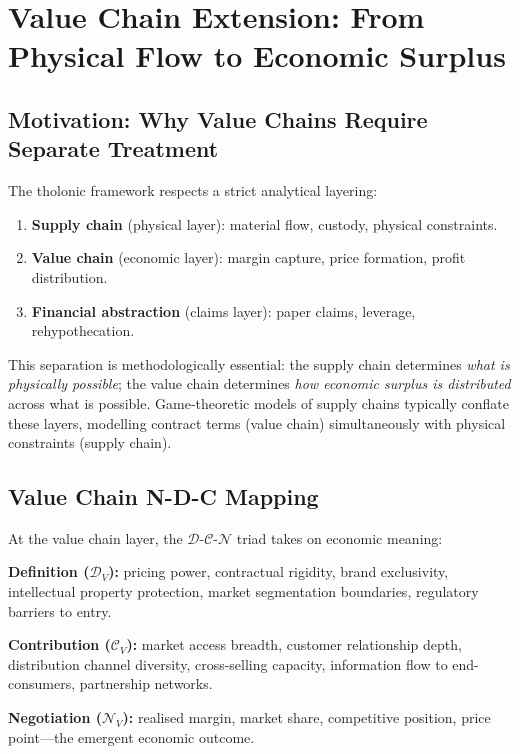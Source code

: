 \documentclass[12pt,a4paper,twocolumn]{article}
\newcommand{\N}{\mathcal{N}}
\newcommand{\D}{\mathcal{D}}
\newcommand{\CC}{\mathcal{C}}
\begin{document}
\section{Value Chain Extension: From Physical Flow to Economic Surplus}
\label{sec:valuechain}

\subsection{Motivation: Why Value Chains Require Separate Treatment}

The tholonic framework respects a strict analytical layering:

\begin{enumerate}[nosep]
  \item \textbf{Supply chain} (physical layer): material flow, custody, physical constraints.
  \item \textbf{Value chain} (economic layer): margin capture, price formation, profit distribution.
  \item \textbf{Financial abstraction} (claims layer): paper claims, leverage, rehypothecation.
\end{enumerate}

This separation is methodologically essential: the supply chain determines \emph{what is physically possible}; the value chain determines \emph{how economic surplus is distributed} across what is possible.
Game-theoretic models of supply chains \citep{Cachon2003} typically conflate these layers, modelling contract terms (value chain) simultaneously with physical constraints (supply chain).

\subsection{Value Chain N-D-C Mapping}

At the value chain layer, the $\D$-$\CC$-$\N$ triad takes on economic meaning:

\textbf{Definition ($\D_V$):} pricing power, contractual rigidity, brand exclusivity, intellectual property protection, market segmentation boundaries, regulatory barriers to entry.

\textbf{Contribution ($\CC_V$):} market access breadth, customer relationship depth, distribution channel diversity, cross-selling capacity, information flow to end-consumers, partnership networks.

\textbf{Negotiation ($\N_V$):} realised margin, market share, competitive position, price point---the emergent economic outcome.
\end{document}
